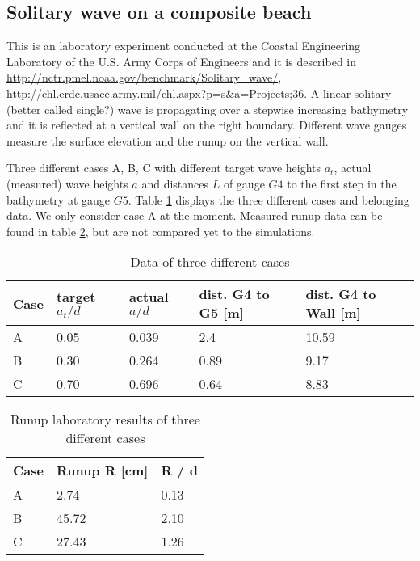 \subsection{Solitary wave on a composite beach}
This is an laboratory experiment conducted at the Coastal Engineering Laboratory of the U.S. Army Corps of Engineers and it is described in \url{http://nctr.pmel.noaa.gov/benchmark/Solitary_wave/}, \url{http://chl.erdc.usace.army.mil/chl.aspx?p=s&a=Projects;36}. 
A linear solitary (better called single?) wave is propagating over a stepwise increasing bathymetry and it is reflected at a vertical wall on the right boundary. Different wave gauges measure the surface elevation and the runup on the vertical wall.

Three different cases A, B, C with different target wave heights $a_t$, actual (measured) wave heights $a$ and distances $L$ of gauge $G4$ to the first step in the bathymetry at gauge $G5$. Table \ref{tab:compositebeach_cases} displays the three different cases and belonging data. We only consider case A at the moment. Measured runup data can be found in table \ref{tab:compositebeach_runup}, but are not compared yet to the simulations.

\begin{table}[htbp]
\begin{tabular}{lllll}
\textbf{Case} & \textbf{target $a_t / d$} & \textbf{actual $a / d$} & \textbf{dist. G4 to G5 [m]} & \textbf{dist. G4 to Wall [m]}  \\
\toprule
A       &     0.05   & 0.039    &   2.4   &  10.59     \\
B       &     0.30   & 0.264    &   0.89  &   9.17     \\
C       &     0.70   & 0.696    &    0.64  &   8.83     \\
\bottomrule
\end{tabular}
\caption{Data of three different cases}
\label{tab:compositebeach_cases}
\end{table}


\begin{table}[htbp]
\begin{tabular}{lll}
\textbf{Case} & \textbf{Runup R [cm]} & \textbf{R / d} \\
\toprule
A       &        2.74   &  0.13 \\
B       &         45.72  &   2.10\\
C       &        27.43  &   1.26 \\
\bottomrule
\end{tabular}
\caption{Runup laboratory results of three different cases}
\label{tab:compositebeach_runup}
\end{table}


